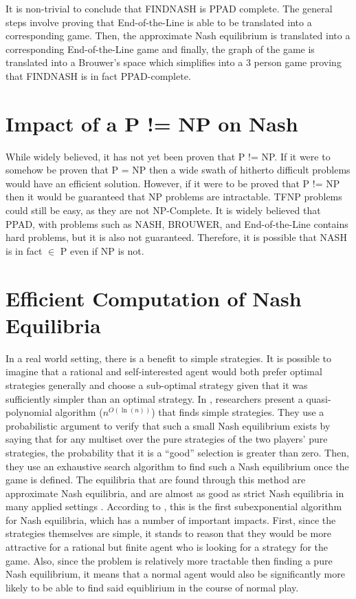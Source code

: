 \documentclass[10pt]{article}
\theoremstyle{definition}
\theoremstyle{remark}
\theoremstyle{definition}
\begin{document}
It is non-trivial to conclude that FINDNASH is PPAD complete. The general steps involve proving that End-of-the-Line is able to be translated into a corresponding game. Then, the approximate Nash equilibrium is translated into a corresponding End-of-the-Line game and finally, the graph of the game is translated into a Brouwer’s space which simplifies into a 3 person game proving that FINDNASH is in fact PPAD-complete. 

\section{Impact of a P != NP on Nash}
While widely believed, it has not yet been proven that P != NP. If it were to somehow be proven that P = NP then a wide swath of hitherto difficult problems would have an efficient solution. However, if it were to be proved that P != NP then it would be guaranteed that NP problems are intractable. TFNP problems could still be easy, as they are not NP-Complete. It is widely believed that PPAD, with problems such as NASH, BROUWER, and End-of-the-Line contains hard problems, but it is also not guaranteed. Therefore, it is possible that NASH is in fact $\in$ P even if NP is not. 

\section{Efficient Computation of Nash Equilibria}
In a real world setting, there is a benefit to simple strategies. It is possible to imagine that a rational and self-interested agent would both prefer optimal strategies generally and choose a sub-optimal strategy given that it was sufficiently simpler than an optimal strategy. In \cite{lipton2003playing}, researchers present a quasi-polynomial algorithm ($n^{O(\ln (n))}$) that finds simple strategies. They use a probabilistic argument to verify that such a small Nash equilibrium exists by saying that for any multiset over the pure strategies of the two players' pure strategies, the probability that it is a “good” selection is greater than zero. Then, they use an exhaustive search algorithm to find such a Nash equilibrium once the game is defined. The equilibria that are found through this method are approximate Nash equilibria, and are almost as good as strict Nash equilibria in many applied settings \cite{lipton2003playing}. According to \cite{lipton2003playing}, this is the first subexponential algorithm for Nash equilibria, which has a number of important impacts. First, since the strategies themselves are simple, it stands to reason that they would be more attractive for a rational but finite agent who is looking for a strategy for the game. Also, since the problem is relatively more tractable then finding a pure Nash equilibrium, it means that a normal agent would also be significantly more likely to be able to find said equiblirium in the course of normal play.
\end{document}
